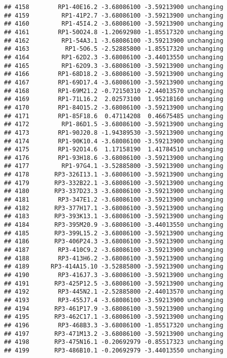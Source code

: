 \documentclass[]{article}
\begin{document}
\begin{verbatim}
## 4158        RP1-40E16.2 -3.68086100 -3.59213900 unchanging
## 4159         RP1-41P2.7 -3.68086100 -3.59213900 unchanging
## 4160         RP1-45I4.2 -3.68086100 -3.59213900 unchanging
## 4161        RP1-50O24.8 -1.20692980 -1.85517320 unchanging
## 4162         RP1-54A3.1 -3.68086100 -3.59213900 unchanging
## 4163          RP1-5O6.5 -2.52885800 -1.85517320 unchanging
## 4164         RP1-62D2.3 -3.68086100 -3.44013550 unchanging
## 4165         RP1-62O9.3 -3.68086100 -3.59213900 unchanging
## 4166        RP1-68D18.2 -3.68086100 -3.59213900 unchanging
## 4167        RP1-69D17.4 -3.68086100 -3.59213900 unchanging
## 4168        RP1-69M21.2 -0.72150310 -2.44013570 unchanging
## 4169        RP1-71L16.2  2.02573100  1.95218160 unchanging
## 4170        RP1-84O15.2 -3.68086100 -3.59213900 unchanging
## 4171        RP1-85F18.6  0.47114208  0.46675485 unchanging
## 4172         RP1-86D1.5 -3.68086100 -3.59213900 unchanging
## 4173        RP1-90J20.8 -1.94389530 -3.59213900 unchanging
## 4174        RP1-90K10.4 -3.68086100 -3.59213900 unchanging
## 4175        RP1-92O14.6  1.17158190  1.41784510 unchanging
## 4176        RP1-93H18.6 -3.68086100 -3.59213900 unchanging
## 4177         RP1-97G4.1 -3.52885800 -3.59213900 unchanging
## 4178       RP3-326I13.1 -3.68086100 -3.59213900 unchanging
## 4179       RP3-332B22.1 -3.68086100 -3.59213900 unchanging
## 4180       RP3-337D23.3 -3.68086100 -3.59213900 unchanging
## 4181        RP3-347E1.2 -3.68086100 -3.59213900 unchanging
## 4182       RP3-377H17.1 -3.68086100 -3.59213900 unchanging
## 4183       RP3-393K13.1 -3.68086100 -3.59213900 unchanging
## 4184       RP3-395M20.9 -3.68086100 -3.44013550 unchanging
## 4185       RP3-399L15.2 -3.68086100 -3.59213900 unchanging
## 4186       RP3-406P24.3 -3.68086100 -3.59213900 unchanging
## 4187        RP3-410C9.2 -3.68086100 -3.59213900 unchanging
## 4188        RP3-413H6.2 -3.68086100 -3.59213900 unchanging
## 4189      RP3-414A15.10 -3.52885800 -3.59213900 unchanging
## 4190        RP3-416J7.3 -3.68086100 -3.59213900 unchanging
## 4191       RP3-425P12.5 -3.68086100 -3.59213900 unchanging
## 4192        RP3-445N2.1 -2.52885800 -2.44013570 unchanging
## 4193        RP3-455J7.4 -3.68086100 -3.59213900 unchanging
## 4194       RP3-461P17.9 -3.68086100 -3.59213900 unchanging
## 4195       RP3-462C17.1 -3.68086100 -3.59213900 unchanging
## 4196        RP3-468B3.3 -3.68086100 -1.85517320 unchanging
## 4197       RP3-471M13.2 -3.68086100 -3.59213900 unchanging
## 4198       RP3-475N16.1 -0.20692979 -0.85517323 unchanging
## 4199       RP3-486B10.1 -0.20692979 -3.44013550 unchanging

\end{verbatim}
\end{document}
